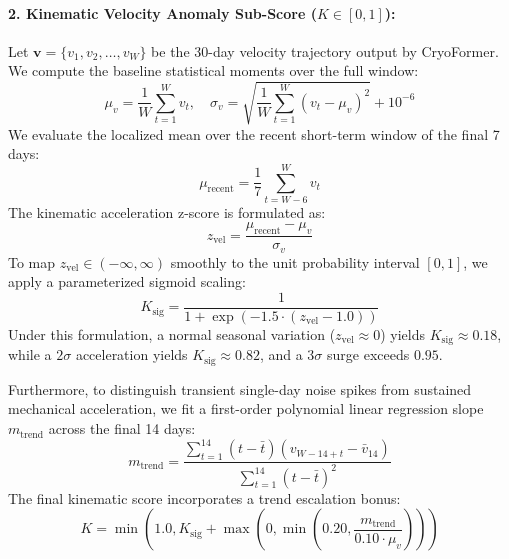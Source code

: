 \documentclass{mnnit}
\begin{document}
\paragraph{2. Kinematic Velocity Anomaly Sub-Score ($K \in [0, 1]$):}
Let $\mathbf{v} = \{v_1, v_2, \dots, v_W\}$ be the 30-day velocity trajectory output by CryoFormer. We compute the baseline statistical moments over the full window:
\begin{equation}
    \mu_v = \frac{1}{W}\sum_{t=1}^W v_t, \quad \sigma_v = \sqrt{\frac{1}{W}\sum_{t=1}^W (v_t - \mu_v)^2} + 10^{-6}
\end{equation}
We evaluate the localized mean over the recent short-term window of the final 7 days:
\begin{equation}
    \mu_{\text{recent}} = \frac{1}{7}\sum_{t=W-6}^W v_t
\end{equation}
The kinematic acceleration z-score is formulated as:
\begin{equation}
    z_{\text{vel}} = \frac{\mu_{\text{recent}} - \mu_v}{\sigma_v}
\end{equation}
To map $z_{\text{vel}} \in (-\infty, \infty)$ smoothly to the unit probability interval $[0, 1]$, we apply a parameterized sigmoid scaling:
\begin{equation}
    K_{\text{sig}} = \frac{1}{1 + \exp\left(-1.5 \cdot (z_{\text{vel}} - 1.0)\right)}
\end{equation}
Under this formulation, a normal seasonal variation ($z_{\text{vel}} \approx 0$) yields $K_{\text{sig}} \approx 0.18$, while a $2\sigma$ acceleration yields $K_{\text{sig}} \approx 0.82$, and a $3\sigma$ surge exceeds $0.95$.

Furthermore, to distinguish transient single-day noise spikes from sustained mechanical acceleration, we fit a first-order polynomial linear regression slope $m_{\text{trend}}$ across the final 14 days:
\begin{equation}
    m_{\text{trend}} = \frac{\sum_{t=1}^{14} (t - \bar{t})(v_{W-14+t} - \bar{v}_{14})}{\sum_{t=1}^{14} (t - \bar{t})^2}
\end{equation}
The final kinematic score incorporates a trend escalation bonus:
\begin{equation}
    K = \min\left(1.0, K_{\text{sig}} + \max\left(0, \min\left(0.20, \frac{m_{\text{trend}}}{0.10 \cdot \mu_v}\right)\right)\right)
    \label{eq:kinematic_score}
\end{equation}
\end{document}
